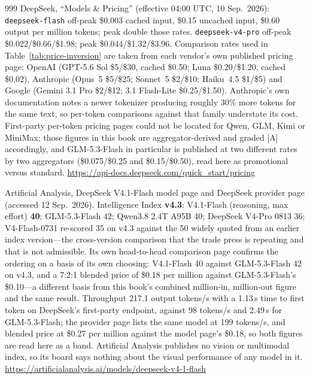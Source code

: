 \begin{thebibliography}{999}
 DeepSeek, ``Models \& Pricing'' (effective 04:00 UTC, 10 Sep.\ 2026): \texttt{deepseek-flash} off-peak \$0.003 cached input, \$0.15 uncached input, \$0.60 output per million tokens; peak double those rates. \texttt{deepseek-v4-pro} off-peak \$0.022/\$0.66/\$1.98; peak \$0.044/\$1.32/\$3.96. Comparison rates used in Table~\ref{tab:price-inversion} are taken from each vendor's own published pricing page: OpenAI (GPT-5.6 Sol \$5/\$30, cached \$0.50; Luna \$0.20/\$1.20, cached \$0.02), Anthropic (Opus~5 \$5/\$25; Sonnet~5 \$2/\$10; Haiku~4.5 \$1/\$5) and Google (Gemini 3.1 Pro \$2/\$12; 3.1 Flash-Lite \$0.25/\$1.50). Anthropic's own documentation notes a newer tokenizer producing roughly 30\% more tokens for the same text, so per-token comparisons against that family understate its cost. First-party per-token pricing pages could not be located for Qwen, GLM, Kimi or MiniMax; those figures in this book are aggregator-derived and graded [A] accordingly, and GLM-5.3-Flash in particular is published at two different rates by two aggregators (\$0.075/\$0.25 and \$0.15/\$0.50), read here as promotional versus standard. \url{https://api-docs.deepseek.com/quick_start/pricing}

 Artificial Analysis, DeepSeek V4.1-Flash model page and DeepSeek provider page (accessed 12 Sep.\ 2026). Intelligence Index \textbf{v4.3}: V4.1-Flash (reasoning, max effort) \textbf{40}; GLM-5.3-Flash 42; Qwen3.8 2.4T A95B 40; DeepSeek V4-Pro 0813 36; V4-Flash-0731 re-scored 35 on v4.3 against the 50 widely quoted from an earlier index version---the cross-version comparison that the trade press is repeating and that is not admissible. Its own head-to-head comparison page confirms the ordering on a basis of its own choosing: V4.1-Flash 40 against GLM-5.3-Flash 42 on v4.3, and a 7:2:1 blended price of \$0.18 per million against GLM-5.3-Flash's \$0.10---a different basis from this book's combined million-in, million-out figure and the same result. Throughput 217.1 output tokens/s with a 1.13\,s time to first token on DeepSeek's first-party endpoint, against 98 tokens/s and 2.49\,s for GLM-5.3-Flash; the provider page lists the same model at 199 tokens/s, and blended price at \$0.27 per million against the model page's \$0.18, so both figures are read here as a band. Artificial Analysis publishes no vision or multimodal index, so its board says nothing about the visual performance of any model in it. \url{https://artificialanalysis.ai/models/deepseek-v4-1-flash}


\end{thebibliography}
